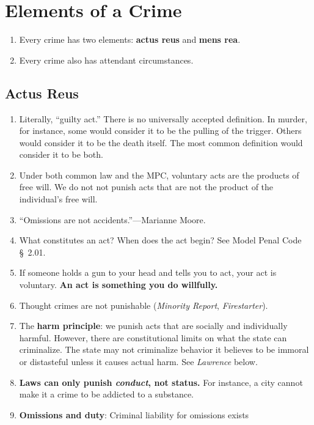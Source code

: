 \section{Elements of a Crime}

\begin{enumerate}
    \item Every crime has two elements: \textbf{actus reus} and \textbf{mens 
    rea}.
    \item Every crime also has attendant circumstances.
\end{enumerate}

\subsection{Actus Reus}

\begin{enumerate}
    \item Literally, ``guilty act.'' There is no universally accepted 
    definition. In murder, for instance, some would consider it to be the 
    pulling of the trigger. Others would consider it to be the death itself.  
    The most common definition would consider it to be both.
    \item Under both common law and the MPC, voluntary acts are the products 
    of free will. We do not not punish acts that are not the product of the 
    individual's free will.
    \item ``Omissions are not accidents.''---Marianne Moore.
    \item What constitutes an act? When does the act begin? See Model Penal 
    Code \S\ 2.01.
    \item If someone holds a gun to your head and tells you to act, your act 
    is voluntary. \textbf{An act is something you do willfully.}
    \item Thought crimes are not punishable (\emph{Minority Report}, 
    \emph{Firestarter}).
    \item The \textbf{harm principle}: we punish acts that are socially and 
    individually harmful. However, there are constitutional limits on what the 
    state can criminalize. The state may not criminalize behavior it believes 
    to be immoral or distasteful unless it causes actual harm. See 
    \emph{Lawrence} below.
    \item \textbf{Laws can only punish \emph{conduct}, not status.} For 
    instance, a city cannot make it a crime to be addicted to a substance.
    \item \textbf{Omissions and duty}: Criminal liability for omissions exists 

\end{enumerate}
